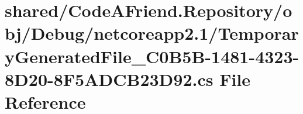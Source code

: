 \hypertarget{shared_2_code_a_friend_8_repository_2obj_2_debug_2netcoreapp2_81_2_temporary_generated_file__03694fae0d06e677617ca8b12d35b3b13b4}{}\section{shared/\+Code\+A\+Friend.Repository/obj/\+Debug/netcoreapp2.1/\+Temporary\+Generated\+File\+\_\+C0\+B5\+B-\/1481-\/4323-\/8\+D20-\/8\+F5\+A\+D\+C\+B23\+D92.cs File Reference}
\label{shared_2_code_a_friend_8_repository_2obj_2_debug_2netcoreapp2_81_2_temporary_generated_file__03694fae0d06e677617ca8b12d35b3b13b4}
